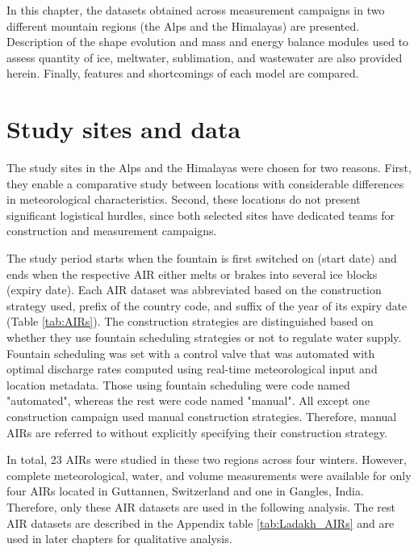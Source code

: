 In this chapter, the datasets obtained across measurement campaigns in two different mountain regions (the Alps and
the Himalayas) are presented. Description of the shape evolution and mass and energy balance modules used to assess quantity of ice, meltwater, sublimation, and wastewater are also provided herein.
Finally, features and shortcomings of each model are compared.

\section{Study sites and data}

The study sites in the Alps and the Himalayas were chosen for two reasons. First, they enable a
comparative study between locations with considerable differences in meteorological characteristics. Second,
these locations do not present significant logistical hurdles, since both selected sites have dedicated
teams for construction and measurement campaigns.

The study period starts when the fountain is first switched on (start date) and ends when the respective \ac{AIR}
either melts or brakes into several ice blocks (expiry date). Each \ac{AIR} dataset was abbreviated based on the
construction strategy used, prefix of the country code, and suffix of the year of its expiry date
(Table \ref{tab:AIRs}). The construction strategies are distinguished based on whether they use fountain scheduling
strategies or not to regulate water supply. Fountain scheduling was set with a control valve that was automated
with optimal discharge rates computed using real-time meteorological input and location metadata. Those using fountain scheduling were
code named "automated", whereas the rest were code named "manual". All except one construction campaign used
manual construction strategies. Therefore, manual \ac{AIRs} are referred to without explicitly
specifying their construction strategy.

In total, 23 \ac{AIRs} were studied in these two regions across four winters. However, complete meteorological, water, and volume measurements were available for only four \ac{AIRs} located in
Guttannen, Switzerland and one in Gangles, India. Therefore,
only these \ac{AIR} datasets are used in the following analysis. The rest \ac{AIR} datasets are described in the
Appendix table \ref{tab:Ladakh_AIRs} and are used in later chapters for qualitative analysis.

